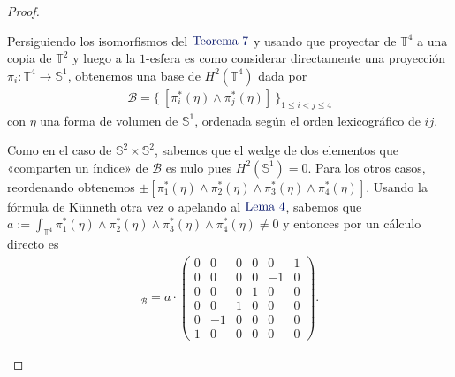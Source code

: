 \documentclass[11pt]{article}
\newcommand{\Ss}{\mathbb{S}}
\newcommand{\T}{\mathbb{T}}
\newcommand{\paint}[1]{\color{color}{#1}}
\newcommand{\tpaing}[1]{\paint{\text{#1}}}
\begin{document}
\begin{proof}
\begin{itemize}[listparindent = \parindent]
\begin{itemize}[listparindent = \parindent]
Persiguiendo los isomorfismos del $\tpaing{Teorema 7}$ y usando que proyectar de $\T^4$ a una copia de $\T^2$ y luego a la $1$-esfera es como considerar directamente una proyección $\pi_i : \T^4 \to \Ss^1$, obtenemos una base de $H^2(\T^4)$ dada por
\begin{align*}
\mathscr{B} = \{ \ [\pi_i^*(\eta) \wedge \pi_j^*(\eta)] \ \}_{1 \leq i <j \leq 4}
\end{align*}
con $\eta$ una forma de volumen de $\Ss^1$, ordenada según el orden lexicográfico de $ij$.

Como en el caso de $\Ss^2 \times \Ss^2$, sabemos que el wedge de dos elementos que «comparten un índice» de $\mathscr{B}$ es nulo pues $H^2(\Ss^1) = 0$. Para los otros casos, reordenando obtenemos $\pm [\pi_1^*(\eta) \wedge \pi_2^*(\eta) \wedge \pi_3^*(\eta) \wedge \pi_4^*(\eta)]$. Usando la fórmula de Künneth otra vez o apelando al $\tpaing{Lema $4$}$, sabemos que $a := \int_{\T^4} \pi_1^*(\eta) \wedge \pi_2^*(\eta) \wedge \pi_3^*(\eta) \wedge \pi_4^*(\eta) \neq 0$ y entonces por un cálculo directo es
\begin{align*}
[\beta]_{\mathscr{B}} = a \cdot \begin{pmatrix}
0 & 0 & 0 & 0 & 0 & 1\\
0 & 0 & 0 & 0 & -1 & 0\\
0 & 0 & 0 & 1 & 0 & 0\\
0 & 0 & 1 & 0 & 0 & 0\\
0 & -1 & 0 & 0 & 0 & 0\\
1 & 0 & 0 & 0 & 0 & 0
\end{pmatrix}.
\end{align*}


\end{itemize}
\end{itemize}
\end{proof}
\end{document}
